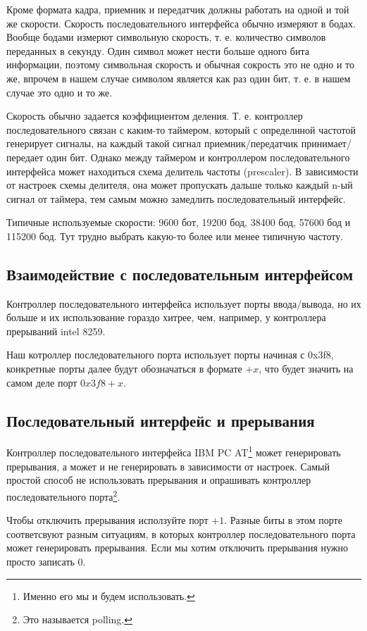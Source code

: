 Кроме формата кадра, приемник и передатчик должны работать на одной и той же
скорости. Скорость последовательного интерфейса обычно измеряют в бодах. Вообще
бодами измерют символьную скорость, т. е. количество символов переданных в
секунду. Один символ может нести больше одного бита информации, поэтому
символьная скорость и обычная сокрость это не одно и то же, впрочем в нашем
случае символом является как раз один бит, т. е. в нашем случае это одно и то
же.

Скорость обычно задается коэффициентом деления. Т. е. контроллер
последовательного связан с каким-то таймером, который с определнной частотой
генерирует сигналы, на каждый такой сигнал приемник/передатчик
принимает/передает один бит. Однако между таймером и контроллером
последовательного интерфейса может находиться схема делитель частоты
(prescaler). В зависимости от настроек схемы делителя, она может пропускать
дальше только каждый n-ый сигнал от таймера, тем самым можно замедлить
последовательный интерфейс.

Типичные используемые скорости: 9600 бот, 19200 бод, 38400 бод, 57600 бод и
115200 бод. Тут трудно выбрать какую-то более или менее типичную частоту.

\subsection{Взаимодействие с последовательным интерфейсом}

Контроллер последовательного интерфейса использует порты ввода/вывода, но их
больше и их использование гораздо хитрее, чем, например, у контроллера
прерываний intel 8259.

Наш котроллер последовательного порта использует порты начиная с 0x3f8,
конкретные порты далее будут обозначаться в формате $+x$, что будет значить
на самом деле порт $0x3f8 + x$.

\subsection{Последовательный интерфейс и прерывания}

Контроллер последовательного интерфейса IBM PC AT\footnote{Именно его мы и будем
использовать.} может генерировать прерывания, а может и не генерировать в
зависимости от настроек. Самый простой способ не использовать прерывания и
опрашивать контроллер последовательного порта\footnote{Это называется polling.}.

Чтобы отключить прерывания исползуйте порт $+1$. Разные  биты в этом порте
соответсвуют разным ситуациям, в которых контроллер последовательного порта
может генерировать прерывания. Если мы хотим отключить прерывания нужно просто
записать 0.

